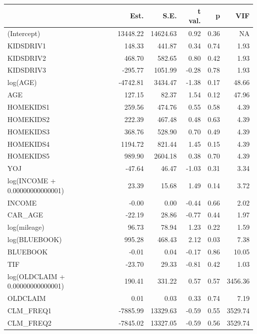 \documentclass[]{article}
\begin{document}
\begin{table}[!h]
\centering
\begin{threeparttable}
\begin{tabular}{lrrrrr}
\toprule
  & Est. & S.E. & t val. & p & VIF\\
\midrule
\rowcolor{gray!6}  (Intercept) & 13448.22 & 14624.63 & 0.92 & 0.36 & NA\\
KIDSDRIV1 & 148.33 & 441.87 & 0.34 & 0.74 & 1.93\\
\rowcolor{gray!6}  KIDSDRIV2 & 468.70 & 582.65 & 0.80 & 0.42 & 1.93\\
KIDSDRIV3 & -295.77 & 1051.99 & -0.28 & 0.78 & 1.93\\
\rowcolor{gray!6}  log(AGE) & -4742.81 & 3434.47 & -1.38 & 0.17 & 48.66\\
\addlinespace
AGE & 127.15 & 82.37 & 1.54 & 0.12 & 47.96\\
\rowcolor{gray!6}  HOMEKIDS1 & 259.56 & 474.76 & 0.55 & 0.58 & 4.39\\
HOMEKIDS2 & 222.39 & 467.48 & 0.48 & 0.63 & 4.39\\
\rowcolor{gray!6}  HOMEKIDS3 & 368.76 & 528.90 & 0.70 & 0.49 & 4.39\\
HOMEKIDS4 & 1194.72 & 821.44 & 1.45 & 0.15 & 4.39\\
\addlinespace
\rowcolor{gray!6}  HOMEKIDS5 & 989.90 & 2604.18 & 0.38 & 0.70 & 4.39\\
YOJ & -47.64 & 46.47 & -1.03 & 0.31 & 3.34\\
\rowcolor{gray!6}  log(INCOME + 0.00000000000001) & 23.39 & 15.68 & 1.49 & 0.14 & 3.72\\
INCOME & -0.00 & 0.00 & -0.44 & 0.66 & 2.02\\
\rowcolor{gray!6}  CAR\_AGE & -22.19 & 28.86 & -0.77 & 0.44 & 1.97\\
\addlinespace
log(mileage) & 96.73 & 78.94 & 1.23 & 0.22 & 1.59\\
\rowcolor{gray!6}  log(BLUEBOOK) & 995.28 & 468.43 & 2.12 & 0.03 & 7.38\\
BLUEBOOK & -0.01 & 0.04 & -0.17 & 0.86 & 10.05\\
\rowcolor{gray!6}  TIF & -23.70 & 29.33 & -0.81 & 0.42 & 1.03\\
log(OLDCLAIM + 0.00000000000001) & 190.41 & 331.22 & 0.57 & 0.57 & 3456.36\\
\addlinespace
\rowcolor{gray!6}  OLDCLAIM & 0.01 & 0.03 & 0.33 & 0.74 & 7.19\\
CLM\_FREQ1 & -7885.99 & 13329.63 & -0.59 & 0.55 & 3529.74\\
\rowcolor{gray!6}  CLM\_FREQ2 & -7845.02 & 13327.05 & -0.59 & 0.56 & 3529.74\\

\end{tabular}
\end{threeparttable}
\end{table}
\end{document}
